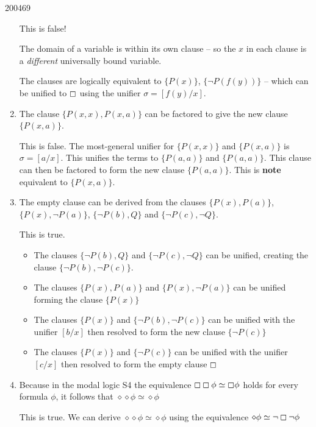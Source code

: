 \documentclass[10pt,\jkfside,a4paper]{article}
\begin{document}
\begin{examquestion}{2004}{6}{9}
\begin{enumerate}
This is false!

The domain of a variable is within its own clause -- so the $x$ in each
clause is a \textit{different} universally bound variable.

The clauses are logically equivalent to $\{P(x)\}$, $\{\neg P(f(y))\}$ --
which can be unified to $\boxempty$ using the unifier $\sigma = [f(y)/x]$.

\item The clause $\{P(x, x), P(x, a)\}$ can be factored to give the new
clause $\{P(x, a)\}$.

This is false. The most-general unifier for $\{P(x, x)\}$ and $\{P(x, a)\}$ is
$\sigma = [a/x]$. This unifies the terms to $\{P(a, a)\}$ and $\{P(a, a)\}$.
This clause can then be factored to form the new clause $\{P(a, a)\}$. This
is \textbf{note} equivalent to $\{P(x, a)\}$.

\item The empty clause can be derived from the clauses $\{P(x), P(a)\}$,
$\{P(x), \neg P(a)\}$, $\{\neg P(b), Q\}$ and $\{\neg P(c), \neg Q\}$.

This is true.

\begin{itemize}

\item The clauses $\{\neg P(b), Q\}$ and $\{\neg P(c), \neg Q\}$ can be
unified, creating the clause $\{\neg P(b), \neg P(c)\}$.

\item The clauses $\{P(x), P(a)\}$ and $\{P(x), \neg P(a)\}$ can be unified
forming the clause $\{P(x)\}$

\item The clauses $\{P(x)\}$ and $\{\neg P(b), \neg P(c)\}$ can be unified
with the unifier $[b/x]$ then resolved to form the new clause $\{\neg P(c)\}$

\item The clauses $\{P(x)\}$ and $\{\neg P(c)\}$ can be unified with the
unifier $[c/x]$ then resolved to form the empty clause $\boxempty$

\end{itemize}

\item Because in the modal logic S4 the equivalence $\boxempty \boxempty
\phi \simeq \boxempty \phi $ holds for every formula $\phi $, it follows
that $\diamond\diamond\phi \simeq \diamond\phi $

This is true. We can derive $\diamond\diamond\phi \simeq \diamond\phi $
using the equivalence $\diamond \phi \simeq \neg \boxempty \neg \phi $


\end{enumerate}
\end{examquestion}
\end{document}
